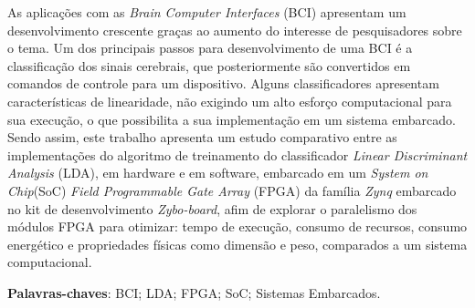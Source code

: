 \begin{resumo}

 As aplicações com as \textit{Brain Computer Interfaces} (BCI) apresentam um desenvolvimento crescente graças ao aumento do interesse de pesquisadores sobre o tema. Um dos principais passos para desenvolvimento de uma BCI é a classificação dos sinais cerebrais, que posteriormente são convertidos em comandos de controle para um dispositivo. Alguns classificadores apresentam características de linearidade, não exigindo um alto esforço computacional para sua execução, o que possibilita a sua implementação em um sistema embarcado. Sendo assim, este trabalho apresenta um estudo comparativo entre as implementações do algoritmo de treinamento  do classificador \textit{Linear Discriminant Analysis} (LDA), em hardware e em software, embarcado em um \textit{System on Chip}(SoC) \textit{Field Programmable Gate Array} (FPGA) da família \textit{Zynq} embarcado no kit de desenvolvimento \textit{Zybo-board}, afim de explorar o paralelismo dos módulos FPGA para otimizar: tempo de execução, consumo de recursos, consumo energético e propriedades físicas como dimensão e peso, comparados a um sistema computacional.
 
 \vspace{\onelineskip}
 
 \noindent
 \textbf{Palavras-chaves}: BCI; LDA; FPGA; SoC; Sistemas Embarcados.
\end{resumo}
